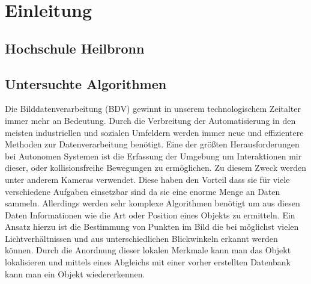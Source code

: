 \chapter{Einleitung}
\section{Hochschule Heilbronn}

\section{Untersuchte Algorithmen}

Die Bilddatenverarbeitung (BDV) gewinnt in unserem technologischem Zeitalter immer mehr an Bedeutung. 
Durch die Verbreitung der Automatisierung in den meisten industriellen und sozialen Umfeldern werden immer neue und effizientere Methoden zur Datenverarbeitung benötigt.
Eine der größten Herausforderungen bei Autonomen Systemen ist die Erfassung der Umgebung um Interaktionen mir dieser, oder kollisionsfreihe Bewegungen zu ermöglichen. 
Zu diesem Zweck werden unter anderem Kameras verwendet.
Diese haben den Vorteil dass sie für viele verschiedene Aufgaben einsetzbar sind da sie eine enorme Menge an Daten sammeln. 
Allerdings werden sehr komplexe Algorithmen benötigt um aus diesen Daten Informationen wie die Art oder Position eines Objekts zu ermitteln. 
Ein Ansatz hierzu ist die Bestimmung von Punkten im Bild die bei möglichst vielen Lichtverhältnissen und aus unterschiedlichen Blickwinkeln erkannt werden können.
Durch die Anordnung dieser lokalen Merkmale kann man das Objekt lokalisieren und mittels eines Abgleichs mit einer vorher erstellten Datenbank kann man ein Objekt wiedererkennen.


